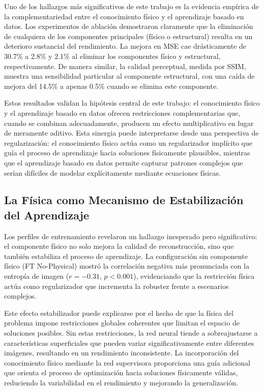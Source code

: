 Uno de los hallazgos más significativos de este trabajo es la evidencia empírica de la complementariedad entre el conocimiento físico y el aprendizaje basado en datos. Los experimentos de ablación demostraron claramente que la eliminación de cualquiera de los componentes principales (físico o estructural) resulta en un deterioro sustancial del rendimiento. La mejora en MSE cae drásticamente de 30.7\% a 2.8\% y 2.1\% al eliminar los componentes físico y estructural, respectivamente. De manera similar, la calidad perceptual, medida por SSIM, muestra una sensibilidad particular al componente estructural, con una caída de mejora del 14.5\% a apenas 0.5\% cuando se elimina este componente.

Estos resultados validan la hipótesis central de este trabajo: el conocimiento físico y el aprendizaje basado en datos ofrecen restricciones complementarias que, cuando se combinan adecuadamente, producen un efecto multiplicativo en lugar de meramente aditivo. Esta sinergia puede interpretarse desde una perspectiva de regularización: el conocimiento físico actúa como un regularizador implícito que guía el proceso de aprendizaje hacia soluciones físicamente plausibles, mientras que el aprendizaje basado en datos permite capturar patrones complejos que serían difíciles de modelar explícitamente mediante ecuaciones físicas.

\subsection{La Física como Mecanismo de Estabilización del Aprendizaje}

Los perfiles de entrenamiento revelaron un hallazgo inesperado pero significativo: el componente físico no solo mejora la calidad de reconstrucción, sino que también estabiliza el proceso de aprendizaje. La configuración sin componente físico (FT No-Physical) mostró la correlación negativa más pronunciada con la entropía de imagen ($r=-0.31$, $p<0.001$), evidenciando que la restricción física actúa como regularizador que incrementa la robustez frente a escenarios complejos.

Este efecto estabilizador puede explicarse por el hecho de que la física del problema impone restricciones globales coherentes que limitan el espacio de soluciones posibles. Sin estas restricciones, la red neural tiende a sobreajustarse a características superficiales que pueden variar significativamente entre diferentes imágenes, resultando en un rendimiento inconsistente. La incorporación del conocimiento físico mediante la red supervisora proporciona una guía adicional que orienta el proceso de optimización hacia soluciones físicamente válidas, reduciendo la variabilidad en el rendimiento y mejorando la generalización.

